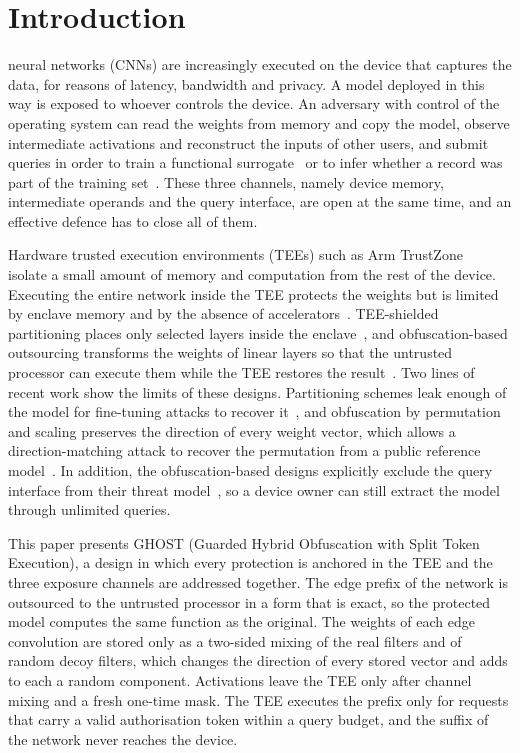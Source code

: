 \documentclass[lettersize,journal]{IEEEtran}
\begin{document}
\section{Introduction}
\label{sec:intro}
 neural networks (CNNs) are increasingly executed on the device that captures the data, for reasons of latency, bandwidth and privacy. A model deployed in this way is exposed to whoever controls the device. An adversary with control of the operating system can read the weights from memory and copy the model, observe intermediate activations and reconstruct the inputs of other users, and submit queries in order to train a functional surrogate~\cite{tramer2016stealing,orekondy2019knockoff} or to infer whether a record was part of the training set~\cite{shokri2017membership,carlini2022lira}. These three channels, namely device memory, intermediate operands and the query interface, are open at the same time, and an effective defence has to close all of them.

Hardware trusted execution environments (TEEs) such as Arm TrustZone~\cite{pinto2019trustzone} isolate a small amount of memory and computation from the rest of the device. Executing the entire network inside the TEE protects the weights but is limited by enclave memory and by the absence of accelerators~\cite{mo2020darknetz}. TEE-shielded partitioning places only selected layers inside the enclave~\cite{mo2020darknetz,zhang2024nplo}, and obfuscation-based outsourcing transforms the weights of linear layers so that the untrusted processor can execute them while the TEE restores the result~\cite{tramer2018slalom,sun2023shadownet,shen2022soter,zhang2024groupcover,sun2025tsqp}. Two lines of recent work show the limits of these designs. Partitioning schemes leak enough of the model for fine-tuning attacks to recover it~\cite{zhang2024nplo}, and obfuscation by permutation and scaling preserves the direction of every weight vector, which allows a direction-matching attack to recover the permutation from a public reference model~\cite{wang2025arrows}. In addition, the obfuscation-based designs explicitly exclude the query interface from their threat model~\cite{sun2023shadownet,mao2025amulet}, so a device owner can still extract the model through unlimited queries.

This paper presents GHOST (Guarded Hybrid Obfuscation with Split Token Execution), a design in which every protection is anchored in the TEE and the three exposure channels are addressed together. The edge prefix of the network is outsourced to the untrusted processor in a form that is exact, so the protected model computes the same function as the original. The weights of each edge convolution are stored only as a two-sided mixing of the real filters and of random decoy filters, which changes the direction of every stored vector and adds to each a random component. Activations leave the TEE only after channel mixing and a fresh one-time mask. The TEE executes the prefix only for requests that carry a valid authorisation token within a query budget, and the suffix of the network never reaches the device.
\end{document}
